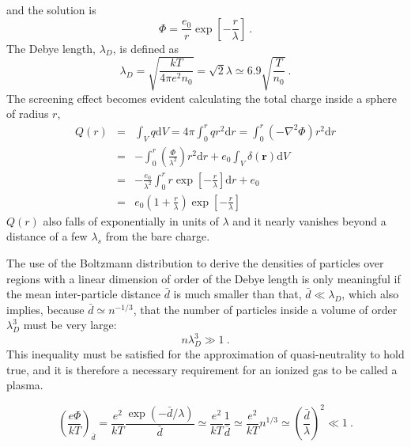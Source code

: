 \documentclass[12pt,a4paper]{article}
\renewcommand{\vec}[1]{\boldsymbol{#1}}
\newcommand{\dif}{\mathrm{d}}
\begin{document}
and the solution is
\begin{equation}
\Phi = \frac{e_0 }{r} \exp \left[-\frac{r}{\lambda} \right] ~.
\end{equation}
The Debye length, $\lambda_D$, is defined as
\begin{equation}
\lambda_D = \sqrt{\frac{kT}{4\pi e^2 n_0}} = \sqrt{2}\lambda \simeq 6.9 \sqrt{\frac{T}{n_0}} ~.
\end{equation}
The screening effect becomes evident calculating the total charge inside a sphere of radius $r$, 
\begin{eqnarray}
\nonumber Q(r) &=& \int_V q\dif V = 4\pi \int_0^r q r^2 \dif r = \int_0^r (-\nabla^2 \Phi) r^2 \dif r \\
\nonumber &=& -\int_0^r \left(\frac{\Phi}{\lambda^2} \right) r^2 \dif r + e_0 \int_V \delta(\vec{r}) \dif V \\
\nonumber &=& -\frac{e_0}{\lambda^2} \int_0^r r \exp \left[ -\frac{r}{\lambda} \right] \dif r +e_0 \\
&=& e_0 \left( 1+\frac{r}{\lambda } \right) \exp \left[ -\frac{r}{\lambda} \right]
\end{eqnarray}
$Q(r)$ also falls of exponentially in units of $\lambda$ and it nearly vanishes beyond a distance of a few $\lambda_s$  from the bare charge. 

The use of the Boltzmann distribution to derive the densities of particles over regions with a linear dimension of order of the Debye length is only meaningful if the mean inter-particle distance $\bar{d}$ is much smaller than that, $\bar{d} \ll \lambda_D$, which also implies, because $\bar{d} \simeq n^{-1/3}$, that the number of particles inside a volume of order $\lambda^3_D$ must be very large:
\begin{equation}
n \lambda^3_D \gg 1 ~.
\end{equation}
This inequality must be satisfied for the approximation of quasi-neutrality to hold true, and it is therefore a necessary requirement for an ionized gas to be called a plasma.

\begin{equation*}
\left(\frac{e\Phi}{kT} \right)_{\bar{d}} = \frac{e^2}{kT} \frac{\exp(-\bar{d}/\lambda)}{\bar{d}} \simeq \frac{e^2}{kT} \frac{1}{\bar{d}} \simeq \frac{e^2}{kT} n^{1/3} \simeq \left(\frac{\bar{d}}{\lambda} \right)^2 \ll 1~.
\end{equation*}
\end{document}
